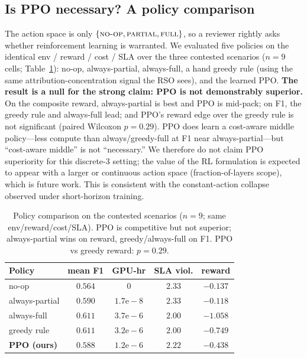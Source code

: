 \documentclass[conference]{IEEEtran}
\begin{document}
\subsection{Is PPO necessary? A policy comparison}\label{sec:ppo-necessity}
The action space is only $\{\textsc{no-op},\textsc{partial},\textsc{full}\}$,
so a reviewer rightly asks whether reinforcement learning is warranted. We
evaluated five policies on the identical env / reward / cost / SLA over the
three contested scenarios ($n{=}9$ cells; Table~\ref{tab:ppo}): no-op,
always-partial, always-full, a hand greedy rule (using the same
attribution-concentration signal the RSO sees), and the learned PPO.
\textbf{The result is a null for the strong claim: PPO is not demonstrably
superior.} On the composite reward, always-partial is best and PPO is
mid-pack; on F1, the greedy rule and always-full lead; and PPO's reward edge
over the greedy rule is not significant (paired Wilcoxon $p=0.29$). PPO does
learn a cost-aware middle policy---less compute than always/greedy-full at
F1 near always-partial---but ``cost-aware middle'' is not ``necessary.'' We
therefore do not claim PPO superiority for this discrete-3 setting; the value
of the RL formulation is expected to appear with a larger or continuous
action space (fraction-of-layers scope), which is future work. This is
consistent with the constant-action collapse observed under short-horizon training.

\begin{table}[t]
\centering
\caption{Policy comparison on the contested scenarios ($n{=}9$; same
env/reward/cost/SLA). PPO is competitive but not superior; always-partial
wins on reward, greedy/always-full on F1. PPO vs greedy reward: $p=0.29$.}
\label{tab:ppo}
\setlength{\tabcolsep}{4pt}
\begin{tabular}{@{}lcccc@{}}
\toprule
\textbf{Policy} & \textbf{mean F1} & \textbf{GPU-hr} & \textbf{SLA viol.} & \textbf{reward}\\
\midrule
no-op            & $0.564$ & $0$        & $2.33$ & $-0.137$\\
always-partial   & $0.590$ & $1.7\mathrm{e}{-}8$ & $2.33$ & $\mathbf{-0.118}$\\
always-full      & $0.611$ & $3.7\mathrm{e}{-}6$ & $2.00$ & $-1.058$\\
greedy rule      & $\mathbf{0.611}$ & $3.2\mathrm{e}{-}6$ & $2.00$ & $-0.749$\\
\textbf{PPO (ours)} & $0.588$ & $1.2\mathrm{e}{-}6$ & $2.22$ & $-0.438$\\
\bottomrule
\end{tabular}
\end{table}
\end{document}
